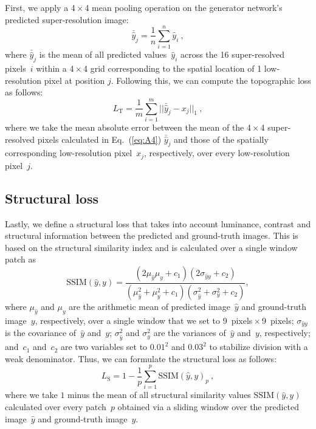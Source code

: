 \documentclass[tc, noline]{copernicus}
\begin{document}
First, we apply a 4\,$\times$\,4 mean pooling operation on the generator network's predicted super-resolution image:
\begin{equation}\label{eq:A4}
\bar{\hat{y}}_j = \dfrac{1}{n} \sum\limits_{i=1}^n \hat{y}_i~,
\end{equation}
where $\bar{\hat{y}}_j$ is the mean of all predicted values~$\hat{y}_i$ across the 16 super-resolved pixels~$i$ within a 4\,$\times$\,4 grid
corresponding to the spatial location of 1 low-resolution pixel at position $j$. Following this, we can compute the topographic loss as follows:
\begin{equation}\label{eq:A5}
L_{\mathrm{T}} = \dfrac{1}{m} \sum\limits_{i=1}^m ||\bar{\hat{y}}_j - x_j||_{1}~,
\end{equation}
where we take the mean absolute error between the mean of the 4\,$\times$\,4 super-resolved pixels calculated in Eq.~(\ref{eq:A4}) $\bar{\hat{y}}_j$
and those of the spatially corresponding low-resolution pixel~$x_j$, respectively, over every low-resolution pixel~$j$.


\subsection{Structural loss}

Lastly, we define a structural loss that takes into account luminance, contrast and structural information between the predicted and ground-truth
images. This is based on the structural similarity index \citep[SSIM;][]{WangImageQualityAssessment2004} and is calculated over a single window patch as
\begin{equation}\label{eq:A6}
\text{SSIM} (\hat{y}, y) = \dfrac{(2\mu_{\hat{y}}\mu_y + c_1)(2\sigma_{{\hat{y}}y} + c_2)}{(\mu_{\hat{y}}^2 + \mu_y^2 + c_1)(\sigma_{\hat{y}}^2 + \sigma_y^2 + c_2)},
\end{equation}
where $\mu_{\hat{y}}$ and $\mu_y$ are the arithmetic mean of predicted image~${\hat{y}}$ and ground-truth image~$y$, respectively, over a single window
that we set to 9~pixels\,$\times$\,9~pixels; $\sigma_{{\hat{y}}y}$ is the covariance of~${\hat{y}}$ and~$y$; $\sigma_{\hat{y}}^2$ and $\sigma_y^2$ are the
variances of~${\hat{y}}$ and~$y$, respectively; and~$c_1$ and~$c_2$ are two variables set to $0.01^2$ and $0.03^2$ to stabilize division with a weak
denominator. Thus, we can formulate the structural loss as follows:
\begin{equation}\label{eq:A7}
L_{\mathrm{S}} = 1 - \dfrac{1}{p} \sum\limits_{i=1}^p \text{SSIM} (\hat{y}, y)_p~,
\end{equation}
where we take $1$ minus the mean of all structural similarity values $\text{SSIM}(\hat{y}, y)$ calculated over every patch~$p$ obtained via a sliding
window over the predicted image~${\hat{y}}$ and ground-truth image~$y$.
\end{document}

